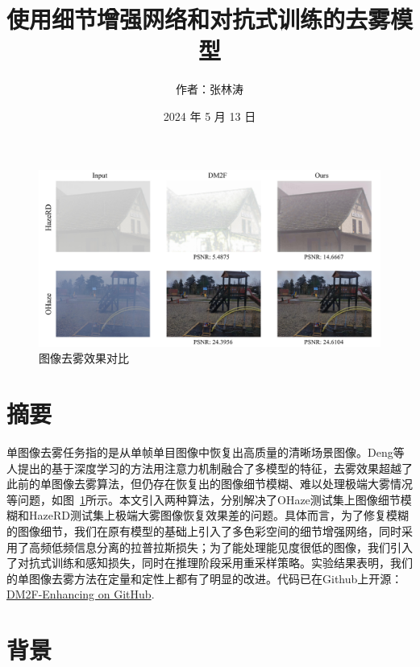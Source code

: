 \documentclass{article}
\title{使用细节增强网络和对抗式训练的去雾模型}
\author{作者：张林涛}
\date{2024 年 5 月 13 日}
\begin{document}
\maketitle

\begin{figure}[t]
  \centering
  \includegraphics[width=.9\linewidth]{image/fig1.pdf}
  \caption{图像去雾效果对比}
  \label{fig:fig1}
\end{figure}

\section{摘要}

单图像去雾任务指的是从单帧单目图像中恢复出高质量的清晰场景图像。Deng等人提出的基于深度学习的方法用注意力机制融合了多模型的特征，去雾效果超越了此前的单图像去雾算法，但仍存在恢复出的图像细节模糊、难以处理极端大雾情况等问题，如图~\ref{fig:fig1}所示。本文引入两种算法，分别解决了OHaze测试集上图像细节模糊和HazeRD测试集上极端大雾图像恢复效果差的问题。具体而言，为了修复模糊的图像细节，我们在原有模型的基础上引入了多色彩空间的细节增强网络，同时采用了高频低频信息分离的拉普拉斯损失；为了能处理能见度很低的图像，我们引入了对抗式训练和感知损失，同时在推理阶段采用重采样策略。实验结果表明，我们的单图像去雾方法在定量和定性上都有了明显的改进。代码已在Github上开源：\href{https://github.com/linghuyuhangyuan/DM2F-Enhancing}{DM2F-Enhancing on GitHub}.

\section{背景}
\end{document}
